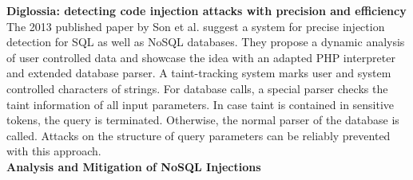 \textbf{Diglossia: detecting code injection attacks with precision and efficiency} \cite{Son:2013} \\
The 2013 published paper by Son et al. suggest a system for precise injection detection for SQL as well as NoSQL databases. They propose a dynamic analysis of user controlled data and showcase the idea with an adapted PHP interpreter and extended database parser. A taint-tracking system marks user and system controlled characters of strings. For database calls, a special parser checks the taint information of all input parameters. In case taint is contained in sensitive tokens, the query is terminated. Otherwise, the normal parser of the database is called. Attacks on the structure of query parameters can be reliably prevented with this approach.\\

\textbf{Analysis and Mitigation of NoSQL Injections} \cite{Ron:2016} \\